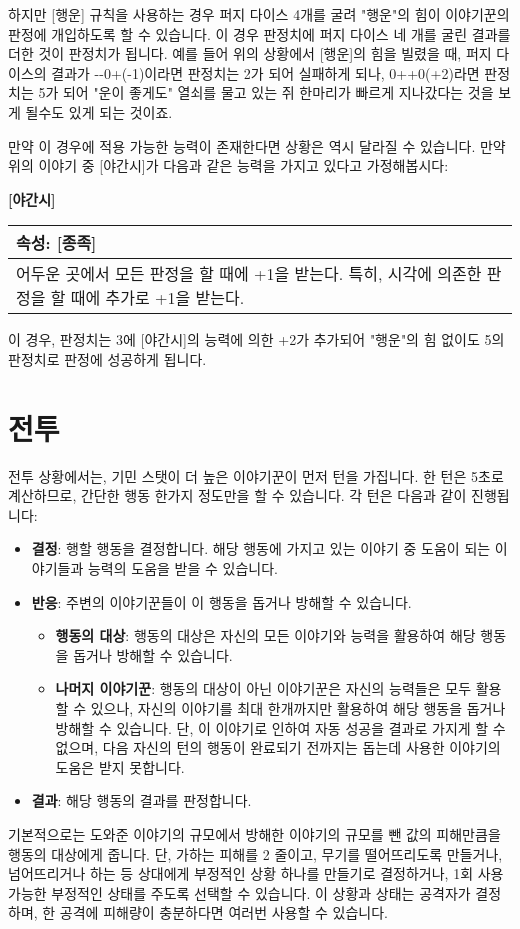 \documentclass[12pt]{report}
\newenvironment{story}[2]
{\begin{center}
		{\large \textbf{[#1]}}\\[1ex]
		\begin{tabular}{|p{\textwidth}|}
			\hline
			\textbf{속성}: #2
			\\
			\hline
		}
		{ 
			\\\hline
		\end{tabular}
	\end{center}
}
\begin{document}
	하지만 [행운] 규칙을 사용하는 경우 퍼지 다이스 4개를 굴려 "행운"의 힘이 이야기꾼의 판정에 개입하도록 할 수 있습니다. 이 경우 판정치에 퍼지 다이스 네 개를 굴린 결과를 더한 것이 판정치가 됩니다. 예를 들어 위의 상황에서 [행운]의 힘을 빌렸을 때, 퍼지 다이스의 결과가 -{}-0+(-1)이라면 판정치는 2가 되어 실패하게 되나, 0++0(+2)라면 판정치는 5가 되어 "운이 좋게도" 열쇠를 물고 있는 쥐 한마리가 빠르게 지나갔다는 것을 보게 될수도 있게 되는 것이죠.
	
	만약 이 경우에 적용 가능한 능력이 존재한다면 상황은 역시 달라질 수 있습니다. 만약 위의 이야기 중 [야간시]가 다음과 같은 능력을 가지고 있다고 가정해봅시다:
	\begin{story}{야간시}{[종족]}
		어두운 곳에서 모든 판정을 할 때에 +1을 받는다. 특히, 시각에 의존한 판정을 할 때에 추가로 +1을 받는다.
	\end{story}
	이 경우, 판정치는 3에 [야간시]의 능력에 의한 +2가 추가되어 "행운"의 힘 없이도 5의 판정치로 판정에 성공하게 됩니다.
	
	\chapter{전투}
	전투 상황에서는, 기민 스탯이 더 높은 이야기꾼이 먼저 턴을 가집니다. 한 턴은 5초로 계산하므로, 간단한 행동 한가지 정도만을 할 수 있습니다. 각 턴은 다음과 같이 진행됩니다:
	\begin{itemize}
		\item \textbf{결정}: 행할 행동을 결정합니다. 해당 행동에 가지고 있는 이야기 중 도움이 되는 이야기들과 능력의 도움을 받을 수 있습니다.
		\item \textbf{반응}: 주변의 이야기꾼들이 이 행동을 돕거나 방해할 수 있습니다.
		\begin{itemize}
			\item \textbf{행동의 대상}: 행동의 대상은 자신의 모든 이야기와 능력을 활용하여 해당 행동을 돕거나 방해할 수 있습니다.
			\item \textbf{나머지 이야기꾼}: 행동의 대상이 아닌 이야기꾼은 자신의 능력들은 모두 활용할 수 있으나, 자신의 이야기를 최대 한개까지만 활용하여 해당 행동을 돕거나 방해할 수 있습니다. 단, 이 이야기로 인하여 자동 성공을 결과로 가지게 할 수 없으며, 다음 자신의 턴의 행동이 완료되기 전까지는 돕는데 사용한 이야기의 도움은 받지 못합니다.
		\end{itemize}
		\item \textbf{결과}: 해당 행동의 결과를 판정합니다.
	\end{itemize}
	기본적으로는 도와준 이야기의 규모에서 방해한 이야기의 규모를 뺀 값의 피해만큼을 행동의 대상에게 줍니다. 단, 가하는 피해를 2 줄이고, 무기를 떨어뜨리도록 만들거나, 넘어뜨리거나 하는 등 상대에게 부정적인 상황 하나를 만들기로 결정하거나, 1회 사용 가능한 부정적인 상태를 주도록 선택할 수 있습니다. 이 상황과 상태는 공격자가 결정하며, 한 공격에 피해량이 충분하다면 여러번 사용할 수 있습니다.
	
\end{document}
